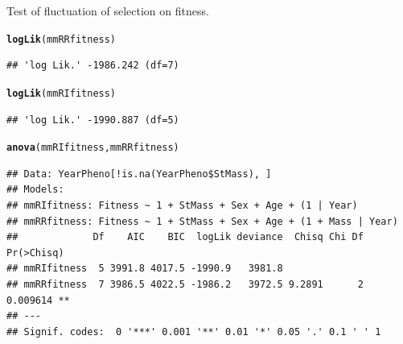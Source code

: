 \documentclass{article}\usepackage[]{graphicx}\usepackage[]{color}
\makeatletter
\newcommand{\hlstd}[1]{\textcolor[rgb]{0.345,0.345,0.345}{#1}}%
\newcommand{\hlkwd}[1]{\textcolor[rgb]{0.737,0.353,0.396}{\textbf{#1}}}%
\newenvironment{kframe}{%
 \def\at@end@of@kframe{}%
 \ifinner\ifhmode%
  \def\at@end@of@kframe{\end{minipage}}%
  \begin{minipage}{\columnwidth}%
 \fi\fi%
 \def\FrameCommand##1{\hskip\@totalleftmargin \hskip-\fboxsep
 \colorbox{shadecolor}{##1}\hskip-\fboxsep
     \hskip-\linewidth \hskip-\@totalleftmargin \hskip\columnwidth}%
 \MakeFramed {\advance\hsize-\width
   \@totalleftmargin\z@ \linewidth\hsize
   \@setminipage}}%
 {\par\unskip\endMakeFramed%
 \at@end@of@kframe}
\newenvironment{knitrout}{}{} %
\makeatother
\begin{document}
Test of fluctuation of selection on fitness.
\begin{knitrout}
\color{fgcolor}\begin{kframe}
\begin{alltt}
\hlkwd{logLik}\hlstd{(mmRRfitness)}
\end{alltt}
\begin{verbatim}
## 'log Lik.' -1986.242 (df=7)
\end{verbatim}
\begin{alltt}
\hlkwd{logLik}\hlstd{(mmRIfitness)}
\end{alltt}
\begin{verbatim}
## 'log Lik.' -1990.887 (df=5)
\end{verbatim}
\begin{alltt}
\hlkwd{anova}\hlstd{(mmRIfitness,mmRRfitness)}
\end{alltt}
\begin{verbatim}
## Data: YearPheno[!is.na(YearPheno$StMass), ]
## Models:
## mmRIfitness: Fitness ~ 1 + StMass + Sex + Age + (1 | Year)
## mmRRfitness: Fitness ~ 1 + StMass + Sex + Age + (1 + Mass | Year)
##             Df    AIC    BIC  logLik deviance  Chisq Chi Df Pr(>Chisq)   
## mmRIfitness  5 3991.8 4017.5 -1990.9   3981.8                            
## mmRRfitness  7 3986.5 4022.5 -1986.2   3972.5 9.2891      2   0.009614 **
## ---
## Signif. codes:  0 '***' 0.001 '**' 0.01 '*' 0.05 '.' 0.1 ' ' 1
\end{verbatim}
\end{kframe}
\end{knitrout}
\end{document}
